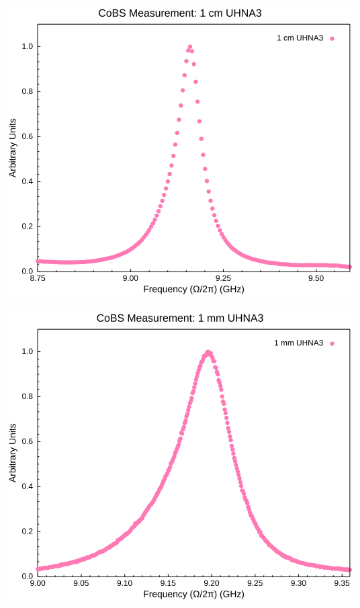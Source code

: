 \begin{figure}[h!]
  \centering
  \begin{subfigure}[b]{0.49\textwidth}
    \centering
    \hspace{-2em}
    \includegraphics[width=\textwidth]{figs/4-Raman/CoBS Measurement: 1 cm UHNA3.png}
    \caption{}
    \label{fig:Raman:1cmUHNA3}
  \end{subfigure}
  \hfill
  \begin{subfigure}[b]{0.49\textwidth}
    \centering
    \hspace{-2em}
    \includegraphics[width=\textwidth]{figs/4-Raman/CoBS Measurement: 1 mm UHNA3.png}

\end{subfigure}
\end{figure}
